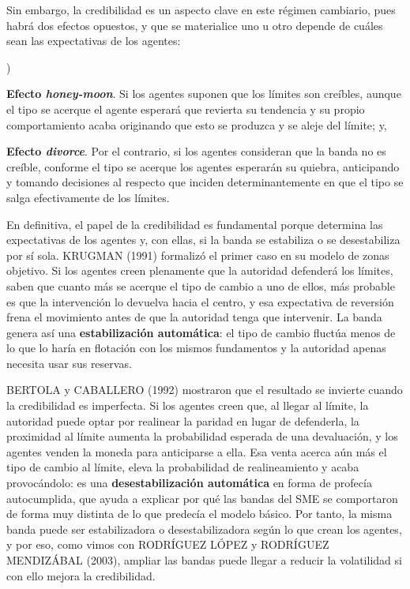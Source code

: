 \documentclass[10pt,a4paper]{article}
\newcounter{alphaitem}
\newenvironment{la}
      {\begin{list}{\alph{alphaitem})}{%
          \usecounter{alphaitem}%
          \setlength{\leftmargin}{1cm}%
          \setlength{\parskip}{3pt}%
          \setlength{\itemsep}{0pt}%
          \setlength{\parsep}{0pt}%
      }}
      {\end{list}}
\begin{document}
Sin embargo, la credibilidad es un aspecto clave en este régimen cambiario, pues habrá dos efectos opuestos, y que se materialice uno u otro depende de cuáles sean las expectativas de los agentes:
\begin{la}
  \item \textbf{Efecto \textit{honey-moon}}. Si los agentes suponen que los límites son creíbles, aunque el tipo se acerque el agente esperará que revierta su tendencia y su propio comportamiento acaba originando que esto se produzca y se aleje del límite; y,
  \item \textbf{Efecto \textit{divorce}}. Por el contrario, si los agentes consideran que la banda no es creíble, conforme el tipo se acerque los agentes esperarán su quiebra, anticipando y tomando decisiones al respecto que inciden determinantemente en que el tipo se salga efectivamente de los límites. 
\end{la}

En definitiva, el papel de la credibilidad es fundamental porque determina las expectativas de los agentes y, con ellas, si la banda se estabiliza o se desestabiliza por sí sola. KRUGMAN (1991) formalizó el primer caso en su modelo de zonas objetivo. Si los agentes creen plenamente que la autoridad defenderá los límites, saben que cuanto más se acerque el tipo de cambio a uno de ellos, más probable es que la intervención lo devuelva hacia el centro, y esa expectativa de reversión frena el movimiento antes de que la autoridad tenga que intervenir. La banda genera así una \textbf{estabilización automática}: el tipo de cambio fluctúa menos de lo que lo haría en flotación con los mismos fundamentos y la autoridad apenas necesita usar sus reservas.

BERTOLA y CABALLERO (1992) mostraron que el resultado se invierte cuando la credibilidad es imperfecta. Si los agentes creen que, al llegar al límite, la autoridad puede optar por realinear la paridad en lugar de defenderla, la proximidad al límite aumenta la probabilidad esperada de una devaluación, y los agentes venden la moneda para anticiparse a ella. Esa venta acerca aún más el tipo de cambio al límite, eleva la probabilidad de realineamiento y acaba provocándolo: es una \textbf{desestabilización automática} en forma de profecía autocumplida, que ayuda a explicar por qué las bandas del SME se comportaron de forma muy distinta de lo que predecía el modelo básico. Por tanto, la misma banda puede ser estabilizadora o desestabilizadora según lo que crean los agentes, y por eso, como vimos con RODRÍGUEZ LÓPEZ y RODRÍGUEZ MENDIZÁBAL (2003), ampliar las bandas puede llegar a reducir la volatilidad si con ello mejora la credibilidad.
\end{document}
